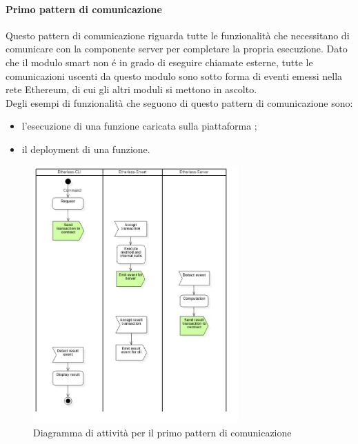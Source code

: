 	\paragraph{Primo pattern di comunicazione}
		Questo pattern di comunicazione riguarda tutte le funzionalità che necessitano di comunicare con la componente server per completare la propria esecuzione. Dato che il modulo smart non é in grado di eseguire chiamate esterne, tutte le comunicazioni uscenti da questo modulo sono sotto forma di eventi emessi nella rete Ethereum, di cui gli altri moduli si mettono in ascolto. \\ Degli esempi di funzionalità che seguono di questo pattern di comunicazione sono:
		\begin{itemize}
			\item l'esecuzione di una funzione caricata sulla piattaforma \NomeProgetto{};
			\item il deployment di una funzione.
		\end{itemize}
		\begin{figure}[H]
			\centering
			\includegraphics[width=0.7\textwidth]{././diagrammi/generali/activity_diag_pattern2.jpg}
			\caption{Diagramma di attività per il primo pattern di comunicazione}
		\end{figure}
